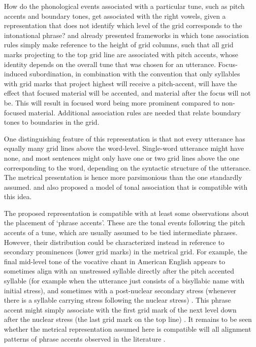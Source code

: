 \documentclass[preprint,review,12pt,authoryear,times]{elsarticle}
\begin{document}
How do the phonological events associated with a particular tune, such as pitch accents and boundary tones, get associated with the right vowels, given a representation that does not identify which level of the grid corresponds to the intonational phrase? \citet{liber75} and \citet{pierr80} already presented frameworks in which tone association rules simply make reference to the height of grid columns, such that all grid marks projecting to the top grid line are associated with pitch accents, whose identity depends on the overall tune that was chosen for an utterance. Focus-induced subordination, in combination with the convention that only syllables with grid marks that project highest will receive a pitch-accent, will have the effect that focused material will be accented, and material after the focus will not be. This will result in focused word being more prominent compared to non-focused material. Additional association rules are needed that relate boundary tones to boundaries in the grid. 

One distinguishing feature of this representation is that not every utterance has equally many grid lines above the word-level. Single-word utterance might have none, and most sentences might only have one or two grid lines above the one corresponding to the word, depending on the syntactic structure of the utterance. The metrical presentation is hence more parsimonious than the one standardly assumed. \citet{gusse90} and \citet{gusse92b} also proposed a model of tonal association that is compatible with this idea.

The proposed representation is compatible with at least some observations about the placement of `phrase accents'. These are the tonal events following the pitch accents of a tune, which are usually assumed to be tied intermediate phrases. However, their distribution could be characterized instead in reference to secondary prominences (lower grid marks) in the metrical grid. For example, the final mid-level tone of the vocative chant in American English appears to sometimes align with an unstressed syllable directly after the pitch accented syllable (for example when the utterance just consists of a bisyllabic name with initial stress), and sometimes with a post-nuclear secondary stress (whenever there is a syllable carrying stress following the nuclear stress)  \citep[cf.][]{liber75,grice00}.  This phrase accent might simply associate with the first grid mark of the next level down after the nuclear stress (the last grid mark on the top line) \citep[see][153ff]{wagner05recursion}.  It remains to be seen whether the metrical representation assumed here is compatible will all alignment patterns of phrase accents observed in the literature \citep[e.g.][]{grice00}.
\end{document}
